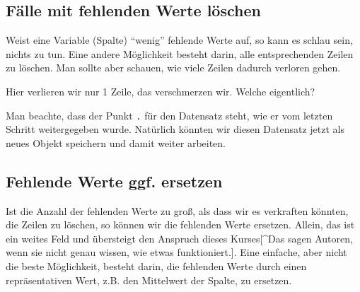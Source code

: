 \documentclass[12pt,]{book}
\newenvironment{Shaded}{\begin{snugshade}}{\end{snugshade}}
\newcommand{\KeywordTok}[1]{\textcolor[rgb]{0.13,0.29,0.53}{\textbf{{#1}}}}
\newcommand{\StringTok}[1]{\textcolor[rgb]{0.31,0.60,0.02}{{#1}}}
\newcommand{\CommentTok}[1]{\textcolor[rgb]{0.56,0.35,0.01}{\textit{{#1}}}}
\newcommand{\NormalTok}[1]{{#1}}
\begin{document}
\subsection{Fälle mit fehlenden Werte
löschen}\label{falle-mit-fehlenden-werte-loschen}

Weist eine Variable (Spalte) ``wenig'' fehlende Werte auf, so kann es
schlau sein, nichts zu tun. Eine andere Möglichkeit besteht darin, alle
entsprechenden Zeilen zu löschen. Man sollte aber schauen, wie viele
Zeilen dadurch verloren gehen.

\begin{Shaded}
\end{Shaded}

Hier verlieren wir nur 1 Zeile, das verschmerzen wir. Welche eigentlich?

\begin{Shaded}
\end{Shaded}

Man beachte, dass der Punkt \texttt{.} für den Datensatz steht, wie er
vom letzten Schritt weitergegeben wurde. Natürlich könnten wir diesen
Datensatz jetzt als neues Objekt speichern und damit weiter arbeiten.

\subsection{Fehlende Werte ggf.
ersetzen}\label{fehlende-werte-ggf.-ersetzen}

Ist die Anzahl der fehlenden Werte zu groß, als dass wir es verkraften
könnten, die Zeilen zu löschen, so können wir die fehlenden Werte
ersetzen. Allein, das ist ein weites Feld und übersteigt den Anspruch
dieses Kurses{[}\^{}Das sagen Autoren, wenn sie nicht genau wissen, wie
etwas funktioniert.{]}. Eine einfache, aber nicht die beste Möglichkeit,
besteht darin, die fehlenden Werte durch einen repräsentativen Wert,
z.B. den Mittelwert der Spalte, zu ersetzen.
\end{document}
